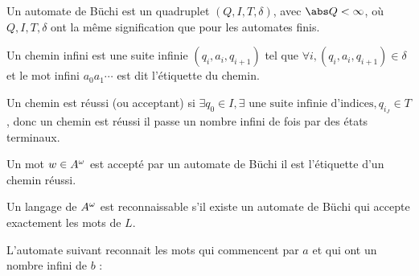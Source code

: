 \begin{definition}
	Un automate de Büchi est un quadruplet $(Q,I,T,\delta)$, avec $\abs Q < \infty$, où
	$Q,I,T,\delta$ ont la même signification que pour les automates finis.
\end{definition}

\begin{definition}
	Un chemin infini est une suite infinie $(q_i,a_i,q_{i+1})$ tel que $\forall i, (q_i,a_i,q_{i+1}) \in \delta$ et le mot
	infini $a_0a_1\cdots$ est dit l'étiquette du chemin.
\end{definition}


\begin{definition}
	Un chemin est réussi (ou acceptant) si $\exists q_0 \in I, \exists \text{ une suite infinie d'indices}, q_{i_J} \in T$,
	donc un chemin est réussi \ssi il passe un nombre infini de fois par des états terminaux.
\end{definition}

\begin{definition}
	Un mot $w \in A^{\omega}$ est accepté par un automate de Büchi \ssi il est l'étiquette d'un chemin réussi.
\end{definition}


\begin{definition}
	Un langage de $A^{\omega}$ est reconnaissable s'il existe un automate de Büchi qui accepte exactement les mots de $L$.
\end{definition}


\begin{exemple}
	L'automate suivant reconnait les mots qui commencent par $a$ et qui ont un nombre infini de $b$ :

\end{exemple}


